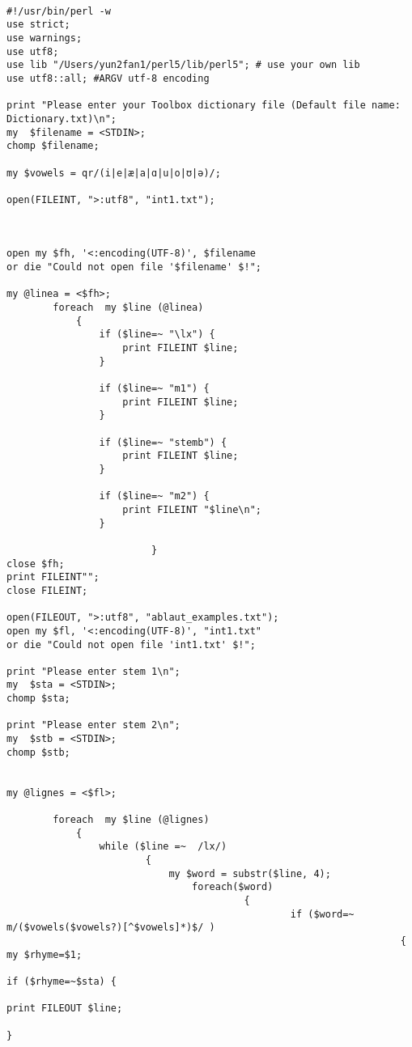 \documentclass[11pt, a4paper]{book}              %
\begin{document}
\begin{lstlisting}

#!/usr/bin/perl -w
use strict;
use warnings;
use utf8;
use lib "/Users/yun2fan1/perl5/lib/perl5"; # use your own lib
use utf8::all; #ARGV utf-8 encoding

print "Please enter your Toolbox dictionary file (Default file name: Dictionary.txt)\n";
my  $filename = <STDIN>;
chomp $filename;

my $vowels = qr/(i|e|æ|a|ɑ|u|o|ʊ|ə)/;

open(FILEINT, ">:utf8", "int1.txt");



open my $fh, '<:encoding(UTF-8)', $filename
or die "Could not open file '$filename' $!";

my @linea = <$fh>;
        foreach  my $line (@linea) 
            {
                if ($line=~ "\lx") {
                    print FILEINT $line;
                }
                
                if ($line=~ "m1") {
                    print FILEINT $line;
                }
                
                if ($line=~ "stemb") {
                    print FILEINT $line;
                }
                
                if ($line=~ "m2") {
                    print FILEINT "$line\n";
                }
                
                         }
close $fh;
print FILEINT"";
close FILEINT;

open(FILEOUT, ">:utf8", "ablaut_examples.txt");
open my $fl, '<:encoding(UTF-8)', "int1.txt"
or die "Could not open file 'int1.txt' $!";

print "Please enter stem 1\n";
my  $sta = <STDIN>;
chomp $sta;

print "Please enter stem 2\n";
my  $stb = <STDIN>;
chomp $stb;


my @lignes = <$fl>;

        foreach  my $line (@lignes) 
            { 
                while ($line =~  /lx/)
                        {
                            my $word = substr($line, 4);
                                foreach($word)
                                         {  
                                                 if ($word=~ m/($vowels($vowels?)[^$vowels]*)$/ )
                                                                    { my $rhyme=$1;
                                                                           if ($rhyme=~$sta) {
                                                                            print FILEOUT $line;
                                                                           }
                                                                 

\end{lstlisting}
\end{document}
